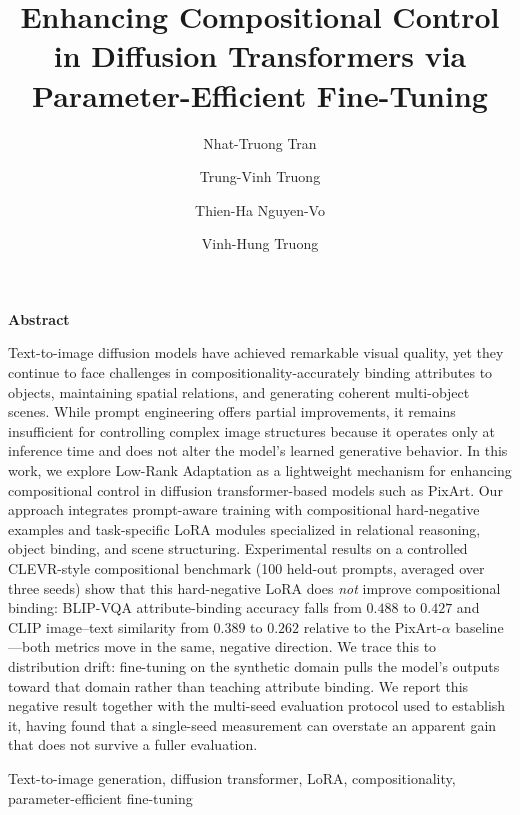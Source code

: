 \documentclass[12pt,onecolumn]{IEEEtran}
\title{Enhancing Compositional Control in Diffusion Transformers via Parameter-Efficient Fine-Tuning}
\author{Nhat-Truong Tran}
\author{Trung-Vinh Truong}
\author{Thien-Ha Nguyen-Vo}
\author{Vinh-Hung Truong}
\affil{University of Science ,VNUHCM}
\affil{Vietnam National University, Ho Chi Minh City, Vietnam}
\affil{\{25c1201480, 25c1201571, 25c1202024, 25c1202334\}@student.hcmus.edu.vn}
\begin{document}
\fontsize{13}{15}\selectfont
\maketitle

\begin{center}
  {\bfseries\fontsize{14}{16}\selectfont Abstract}
\end{center}
\begin{center}
  \begin{minipage}{0.75\textwidth} %
    \fontsize{13}{15}\selectfont
    Text-to-image diffusion models have achieved remarkable visual quality, yet they continue to face challenges in compositionality-accurately binding attributes to objects, maintaining spatial relations, and generating coherent multi-object scenes. While prompt engineering offers partial improvements, it remains insufficient for controlling complex image structures because it operates only at inference time and does not alter the model’s learned generative behavior. In this work, we explore Low-Rank Adaptation as a lightweight mechanism for enhancing compositional control in diffusion transformer-based models such as PixArt. Our approach integrates prompt-aware training with compositional hard-negative examples and task-specific LoRA modules specialized in relational reasoning, object binding, and scene structuring. Experimental results on a controlled CLEVR-style compositional benchmark (100 held-out prompts, averaged over three seeds) show that this hard-negative LoRA does \emph{not} improve compositional binding: BLIP-VQA attribute-binding accuracy falls from $0.488$ to $0.427$ and CLIP image--text similarity from $0.389$ to $0.262$ relative to the PixArt-$\alpha$ baseline---both metrics move in the same, negative direction. We trace this to distribution drift: fine-tuning on the synthetic domain pulls the model's outputs toward that domain rather than teaching attribute binding. We report this negative result together with the multi-seed evaluation protocol used to establish it, having found that a single-seed measurement can overstate an apparent gain that does not survive a fuller evaluation.
  \end{minipage}
\end{center}

\begin{IEEEkeywords}
Text-to-image generation, diffusion transformer, LoRA, compositionality, parameter-efficient fine-tuning
\end{IEEEkeywords}
\end{document}
